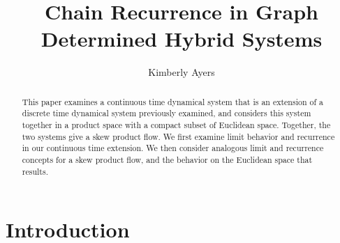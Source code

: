 \documentclass[11pt]{article}
\title{Chain Recurrence in Graph Determined Hybrid Systems}
\author{Kimberly Ayers}
\date{}
\begin{document}
\maketitle

\begin{abstract}
This paper examines a continuous time dynamical system that is an extension of a discrete time dynamical system previously examined, and considers this system together in a product space with a compact subset of Euclidean space. Together, the two systems give a skew product flow.  We first examine limit behavior and recurrence in our continuous time extension.  We then consider analogous limit and recurrence concepts for a skew product flow, and the behavior on the Euclidean space that results. 
\end{abstract}
\section{Introduction}
\vspace{2mm}

\end{document}
